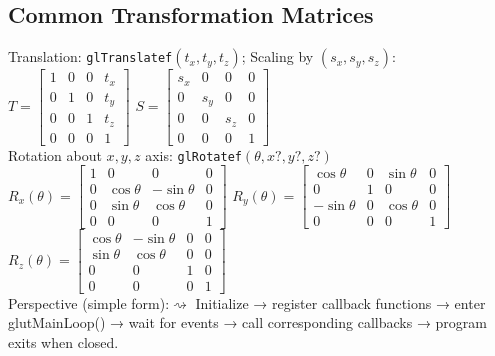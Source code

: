 \documentclass[8pt,twocolumn]{extarticle}
\begin{document}
\subsection*{Common Transformation Matrices}
Translation: \texttt{glTranslatef$(t_x,t_y,t_z)$}; Scaling by $(s_x,s_y,s_z)$:\\
  $
  T = \begin{bmatrix}
  1 & 0 & 0 & t_x \\
  0 & 1 & 0 & t_y \\
  0 & 0 & 1 & t_z \\
  0 & 0 & 0 & 1
  \end{bmatrix}
  $
  $
  S = \begin{bmatrix}
  s_x & 0 & 0 & 0 \\
  0 & s_y & 0 & 0 \\
  0 & 0 & s_z & 0 \\
  0 & 0 & 0 & 1
  \end{bmatrix}
  $\\
Rotation about $x, y, z$ axis: \texttt{glRotatef$(\theta, x?, y?, z?)$}\\
$
R_x(\theta) =
\begin{bmatrix}
1 & 0 & 0 & 0 \\
0 & \cos\theta & -\sin\theta & 0 \\
0 & \sin\theta & \cos\theta & 0 \\
0 & 0 & 0 & 1
\end{bmatrix}
$
$
R_y(\theta) =
\begin{bmatrix}
\cos\theta & 0 & \sin\theta & 0 \\
0 & 1 & 0 & 0 \\
-\sin\theta & 0 & \cos\theta & 0 \\
0 & 0 & 0 & 1
\end{bmatrix}
$\\
$
R_z(\theta) =
\begin{bmatrix}
\cos\theta & -\sin\theta & 0 & 0 \\
\sin\theta & \cos\theta & 0 & 0 \\
0 & 0 & 1 & 0 \\
0 & 0 & 0 & 1
\end{bmatrix}
$\\
Perspective (simple form):$\rightsquigarrow$
Initialize → register callback functions → enter glutMainLoop() → wait for events → call corresponding callbacks → program exits when closed.
\end{document}
